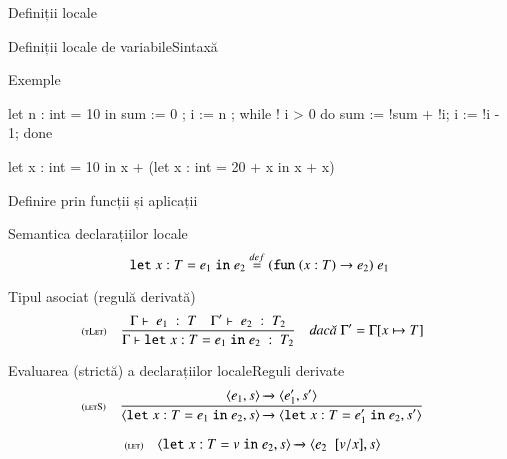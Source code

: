 \documentclass[xcolor=pdftex,romanian,colorlinks]{beamer}
\begin{document}
\begin{section}{Definiții locale}
\begin{frame}[fragile]{Definiții locale de variabile}{Sintaxă}

\vfill 
\begin{block}{Exemple}
\begin{minipage}[t]{.35\columnwidth}
\begin{asciiml}
let n : int = 10 in
  sum := 0 ;
  i := n ;
  while ! i > 0 do
     sum  := !sum + !i;
     i := !i - 1;
  done
\end{asciiml}
\end{minipage}
\hfill\begin{minipage}[t]{.55\columnwidth}
\begin{asciiml}
let x : int = 10 in
   x + (let x : int = 20 + x in 
          x + x)
\end{asciiml}
\end{minipage}
\end{block}
\end{frame}

\begin{frame}{Definire prin funcții și aplicații}
\begin{block}{Semantica declarațiilor locale}
\[\mathrel{\text{\ttfamily let}} x : T = e_1 \mathrel{\text{\ttfamily in}} e_2  \stackrel{def}{=} (\mathrel{\text{\ttfamily fun}} (x : T) \rightarrow e_2)\; e_1\]
\end{block}
\vfill
\begin{block}{Tipul asociat (regulă derivată)}
\[\reg[tLet]{\tjud{\Slet x : T = e_1 \Sin e_2}{T_2}}{\tjud{e_1}{T} \si \tjud[\Gamma']{e_2}{T_2}}{\Gamma' = \Gamma[x\mapsto T]}\]
\end{block}
\end{frame}

\begin{frame}{Evaluarea (strictă) a declarațiilor locale}{Reguli derivate}
\[\reg[letS]{\Ss{\c{\Slet x : T = e_1 \Sin e_2,s}}{\c{\Slet x : T = e_1' \Sin e_2,s'}}}{\Ss{\c{e_1,s}}{\c{e_1',s'}}}{}\]

\[\reg[let]{\Ss{\c{\Slet x : T = v \Sin e_2,s}}{\c{\substapp{e_2}{\subst{\substpair{v}{x}}},s}}}{}{}\]
\end{frame}


\end{section}
\end{document}
